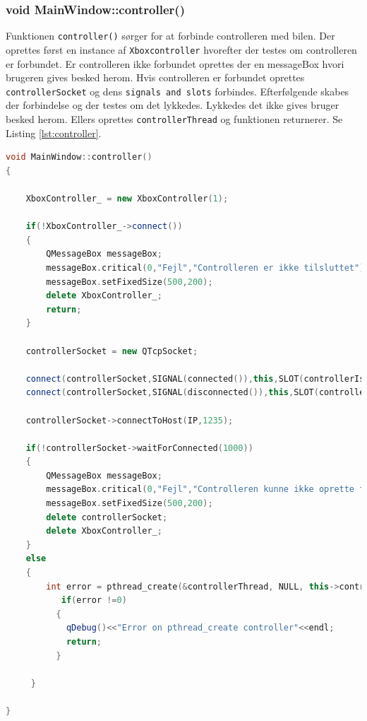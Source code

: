 \subsubsection{void MainWindow::controller()}
Funktionen \texttt{controller()} sørger for at forbinde controlleren med bilen. Der oprettes først en instance af \texttt{Xboxcontroller} hvorefter der testes om controlleren er forbundet. Er controlleren ikke forbundet oprettes der en messageBox hvori brugeren gives besked herom. Hvis controlleren er forbundet oprettes \texttt{controllerSocket} og dens \texttt{signals and slots} forbindes. Efterfølgende skabes der forbindelse og der testes om det lykkedes. Lykkedes det ikke gives bruger besked herom. Ellers oprettes \texttt{controllerThread} og funktionen returnerer. Se Listing \ref{lst:controller}.
\begin{lstlisting}[caption={controller},label=lst:controller, language=c++]
void MainWindow::controller()
{

    XboxController_ = new XboxController(1);

    if(!XboxController_->connect())
    {
        QMessageBox messageBox;
        messageBox.critical(0,"Fejl","Controlleren er ikke tilsluttet");
        messageBox.setFixedSize(500,200);
        delete XboxController_;
        return;
    }

    controllerSocket = new QTcpSocket;

    connect(controllerSocket,SIGNAL(connected()),this,SLOT(controllerIsConnected()),Qt::AutoConnection);
    connect(controllerSocket,SIGNAL(disconnected()),this,SLOT(controllerLostConnection()),Qt::AutoConnection);

    controllerSocket->connectToHost(IP,1235);

    if(!controllerSocket->waitForConnected(1000))
    {
        QMessageBox messageBox;
        messageBox.critical(0,"Fejl","Controlleren kunne ikke oprette forbindelse til bilen");
        messageBox.setFixedSize(500,200);
        delete controllerSocket;
        delete XboxController_;
    }
    else
    {
        int error = pthread_create(&controllerThread, NULL, this->controllerStreamHelper ,this);
           if(error !=0)
          {
            qDebug()<<"Error on pthread_create controller"<<endl;
            return;
          }

     }

}
\end{lstlisting}
